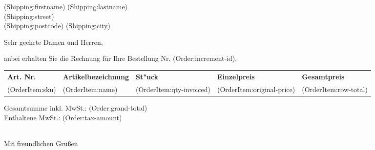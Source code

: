 \documentclass[DIN, pagenumber=false, parskip=half,%
               fromalign=right, fromphone=true, fromfax=true,
               fromrule=false]{scrlttr2}
\begin{document}
 

\begin{letter}{(Shipping:firstname) (Shipping:lastname) \\ (Shipping:street) \\ (Shipping:postcode) (Shipping:city)}

\opening{Sehr geehrte Damen und Herren,}

anbei erhalten Sie die Rechnung für Ihre Bestellung Nr. (Order:increment-id). \\


\begin{longtable}{p{2.5cm}p{6.5cm}p{2cm}p{2cm}p{2cm}}

\hline 	
Art. Nr. & Artikelbezeichnung & St"uck & Einzelpreis & Gesamtpreis\\
\hline 
(OrderItem:sku) & (OrderItem:name) & (OrderItem:qty-invoiced) &(OrderItem:original-price) & (OrderItem:row-total)\\
\hline 
\hline 
\end{longtable}
Gesamtsumme inkl. MwSt.: (Order:grand-total) \\
Enthaltene MwSt.: (Order:tax-amount) \\



\closing{\\ Mit freundlichen Grüßen}
\end{letter}
 
\end{document}
